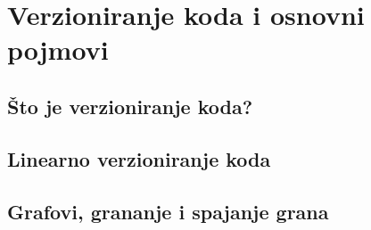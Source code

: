 \chapter*{Verzioniranje koda i osnovni pojmovi}
\clearpage

\section*{Što je verzioniranje koda?}
\clearpage


\clearpage

\section*{Linearno verzioniranje koda}
\clearpage


\clearpage


\clearpage

\section*{Grafovi, grananje i spajanje grana}
\clearpage


\clearpage


\clearpage


\clearpage


\clearpage


\clearpage


\clearpage


\clearpage


\clearpage


\clearpage